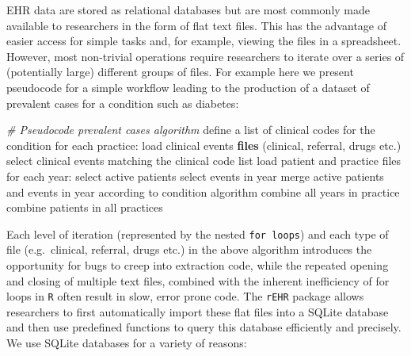 \documentclass[]{article}
\newenvironment{Shaded}{\begin{snugshade}}{\end{snugshade}}
\newcommand{\KeywordTok}[1]{\textcolor[rgb]{0.13,0.29,0.53}{\textbf{{#1}}}}
\newcommand{\StringTok}[1]{\textcolor[rgb]{0.31,0.60,0.02}{{#1}}}
\newcommand{\CommentTok}[1]{\textcolor[rgb]{0.56,0.35,0.01}{\textit{{#1}}}}
\newcommand{\NormalTok}[1]{{#1}}
\begin{document}
EHR data are stored as relational databases but are most commonly made
available to researchers in the form of flat text files. This has the
advantage of easier access for simple tasks and, for example, viewing
the files in a spreadsheet. However, most non-trivial operations require
researchers to iterate over a series of (potentially large) different
groups of files. For example here we present pseudocode for a simple
workflow leading to the production of a dataset of prevalent cases for a
condition such as diabetes:

\begin{Shaded}
\begin{Highlighting}[]
\CommentTok{# Pseudocode prevalent cases algorithm    }
\NormalTok{define a list of clinical codes for the condition}
\NormalTok{for each practice:}
\StringTok{    }\NormalTok{load clinical events }\KeywordTok{files} \NormalTok{(clinical, referral, drugs etc.)}
    \NormalTok{select clinical events matching the clinical code list}
    \NormalTok{load patient and practice files}
    \NormalTok{for each year:}
\StringTok{        }\NormalTok{select active patients}
        \NormalTok{select events in year}
        \NormalTok{merge active patients and events in year according to condition algorithm}
    \NormalTok{combine all years in practice}
\NormalTok{combine patients in all practices}
\end{Highlighting}
\end{Shaded}

Each level of iteration (represented by the nested \texttt{for loops})
and each type of file (e.g.~clinical, referral, drugs etc.) in the above
algorithm introduces the opportunity for bugs to creep into extraction
code, while the repeated opening and closing of multiple text files,
combined with the inherent inefficiency of for loops in \texttt{R} often
result in slow, error prone code. The \texttt{rEHR} package allows
researchers to first automatically import these flat files into a SQLite
database and then use predefined functions to query this database
efficiently and precisely. We use SQLite databases for a variety of
reasons:
\end{document}

